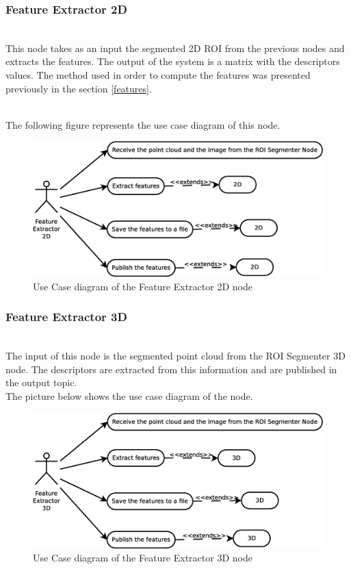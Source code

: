 \subsubsection{Feature Extractor 2D}\\
	This node takes as an input the segmented 2D ROI from the previous nodes and extracts the features. The output of the system is a matrix with the descriptors values. The method used in order to compute the features was presented previously in the section  \ref{features}.

	\\

	The following figure represents the use case diagram of this node. 
	\begin{figure}[H]
		\centering
			\includegraphics[scale=0.4]{img/diagrams/uc_feature_extractor_2d.eps}
			\caption[Use case diagram Feature Extractor 2D node]{Use Case diagram of the Feature Extractor 2D node}
		
	\end{figure}

\subsubsection{Feature Extractor 3D}\\
	The input of this node is the segmented point cloud from the ROI Segmenter 3D node. The descriptors are extracted from this information and are published in the output topic. 
	\\

	The picture below shows the use case diagram of the node. 

	\begin{figure}[H]
		\centering
			\includegraphics[scale=0.4]{img/diagrams/uc_feature_extractor_3d.eps}
			\caption[Use case diagram Feature Extractor 3D node]{Use Case diagram of the Feature Extractor 3D node}
		
	\end{figure}

